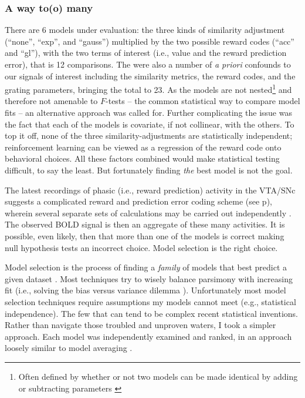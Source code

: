 \documentclass[doc,12pt]{apa}        %
\begin{document}
\subsubsection{A way to(o) many}
\label{subsub:tomany}
There are 6 models under evaluation: the three kinds of similarity adjustment (``none'', ``exp'', and ``gauss'') multiplied by the two possible reward codes (``acc'' and ``gl''), with the two terms of interest (i.e., value and the reward prediction error), that is 12 comparisons.  The were also a number of \emph{a priori} confounds to our signals of interest including the similarity metrics, the reward codes, and the grating parameters, bringing the total to 23.  As the models are not nested\footnote{
    Often defined by whether or not two models can be made identical by adding or subtracting parameters \cite{Forster:2000p9623}} and therefore not amenable to $F$-tests -- the common statistical way to compare model fits -- an alternative approach was called for.  Further complicating the issue was the fact that each of the models is covariate, if not collinear, with the others.  To top it off, none of the three similarity-adjustments are statistically independent; reinforcement learning can be viewed as a regression of the reward code onto behavioral choices.  All these factors combined would make statistical testing difficult, to say the least.  But fortunately finding \emph{the} best model is not the goal.  

The latest recordings of phasic (i.e., reward prediction) activity in the VTA/SNc suggests a complicated reward and prediction error coding scheme (see p\pageref{subsub:expectations}), wherein several separate sets of calculations may be carried out independently \cite{Kim:2006p1063, Matsumoto:2009p7219, Smith:2011p8133}.  The observed BOLD signal is then an aggregate of these many activities. It is possible, even likely, then that more than one of the models is correct making null hypothesis tests an incorrect choice.  Model selection is the right choice.

Model selection is the process of finding a \emph{family} of models that best predict a given dataset \cite{Rao:2001p9457}.  Most techniques try to wisely balance parsimony with increasing fit (i.e., solving the bias versus variance dilemma \cite{Geman:1p9469}).  Unfortunately most model selection techniques require assumptions my models cannot meet (e.g., statistical independence).  The few that can tend to be complex recent statistical inventions.  Rather than navigate those troubled and unproven waters, I took a simpler approach. Each model was independently examined and ranked, in an approach loosely similar to model averaging \cite{Forster:2000p9623}.
\end{document}
